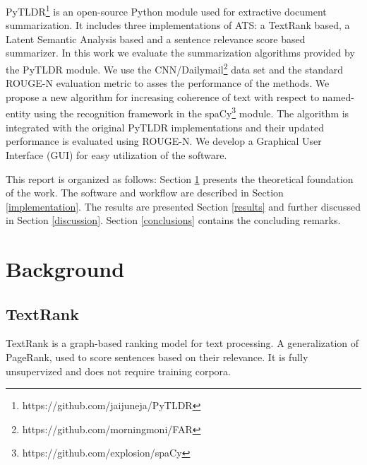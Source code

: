 \documentclass[conference]{IEEEtran}
\begin{document}
PyTLDR\footnote{https://github.com/jaijuneja/PyTLDR} is an open-source Python module used for extractive document summarization. It includes three implementations of ATS: a TextRank based, a Latent Semantic Analysis based and a sentence relevance score based summarizer. In this work we evaluate the summarization algorithms provided by the PyTLDR module. We use the CNN/Dailymail\footnote{https://github.com/morningmoni/FAR} data set and the standard ROUGE-N evaluation metric to asses the performance of the methods. We propose a new algorithm for increasing coherence of text with respect to named-entity using the recognition framework in the spaCy\footnote{https://github.com/explosion/spaCy} module. The algorithm is integrated with the original PyTLDR implementations and their updated performance is evaluated using ROUGE-N. We develop a Graphical User Interface (GUI) for easy utilization of the software.

This report is organized as follows: Section \ref{background} presents the theoretical foundation of the work. 
The software and workflow are described in Section \ref{implementation}. The results are presented Section \ref{results} and further discussed in Section \ref{discussion}. Section \ref{conclusions} contains the concluding remarks.

\section{Background}\label{background}

\subsection{TextRank}
TextRank \cite{mihalcea2004} is a graph-based ranking model for text processing. A generalization of PageRank, used to score sentences based on their relevance. It is fully unsupervized and does not require training corpora. 
\end{document}
